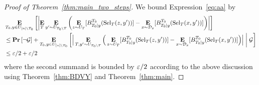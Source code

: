 \begin{proof}[Proof of Theorem~\ref{thm:main_two_steps}]
We bound Expression~\eqref{eq:aa} by 
%
\begin{align*}
	&\mathop{\bf E\/}_{T_0,y\in U_{[n]\setminus T_0}}\left[\left|\mathop{\bf E\/}_{T} \mathop{\bf E\/}_{y' \sim U_{T_0 \setminus T}} \left(\mathop{\bf E\/}_{z\sim U_{T}} [B^{T_0}_{T_0|y}(\mathrm{Sel}_T(z,y'))]- \mathop{\bf E\/}_{x\sim {\mathcal{D}_x}} [B^{T_0}_{T_0|y}(\mathrm{Sel}_T(x,y'))]\right)\right|\right]
	\\&\le \mathop{\bf Pr\/}\left[\neg {\cal G}\right]  + \mathop{\bf E\/}_{T_0,y\in U_{[n]\setminus T_0}}\left[\Big|\mathop{\bf E\/}_{T,y' \sim U_{T_0 \setminus T}} \Big(\mathop{\bf E\/}_{z\sim U_{T}} [B^{T_0}_{T_0|y}(\mathrm{Sel}_T(z,y'))]- \mathop{\bf E\/}_{x\sim {\mathcal{D}_x}} [B^{T_0}_{T_0|y}(\mathrm{Sel}_T(x,y'))]\Big)\Big| \; \bigg| \; {\cal G} \right]
	\\& \le \varepsilon/2 + \varepsilon/2
\end{align*}
%
where the second summand is bounded by $\varepsilon/2$ according to the above discussion using Theorem~\ref{thm:BDVY} and Theorem~\ref{thm:main}.
	\end{proof}
